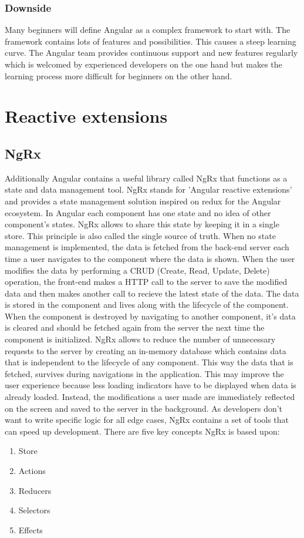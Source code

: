 \subsubsection{Downside}
Many beginners will define Angular as a complex framework to start with. The framework contains lots of features and possibilities. This causes a steep learning curve. The Angular team provides continuous support and new features regularly which is welcomed by experienced developers on the one hand but makes the learning process more difficult for beginners on the other hand.
\autocite{AltexSoft}

\section {Reactive extensions}
\subsection{NgRx}
Additionally Angular contains a useful library called NgRx that functions as a state and data management tool. NgRx stands for 'Angular reactive extensions' and provides a state management solution inspired on redux for the Angular ecosystem. In Angular each component has one state and no idea of other component's states. NgRx allows to share this state by keeping it in a single store. This principle is also called the single source of truth. When no state management is implemented, the data is fetched from the back-end server each time a user navigates to the component where the data is shown. When the user modifies the data by performing a CRUD (Create, Read, Update, Delete) operation, the front-end makes a HTTP call to the server to save the modified data and then makes another call to recieve the latest state of the data. The data is stored in the component and lives along with the lifecycle of the component. When the component is destroyed by navigating to another component, it's data is cleared and should be fetched again from the server the next time the component is initialized. NgRx allows to reduce the number of unnecessary requests to the server by creating an in-memory database which contains data that is independent to the lifecycle of any component. This way the data that is fetched, survives during navigations in the application. This may improve the user experience because less loading indicators have to be displayed when data is already loaded. Instead, the modifications a user made are immediately reflected on the screen and saved to the server in the background. As developers don't want to write specific logic for all edge cases, NgRx contains a set of tools that can speed up development. There are five key concepts NgRx is based upon:
\begin{enumerate}
	\item Store
	\item Actions
	\item Reducers
	\item Selectors
	\item Effects
\end{enumerate}

